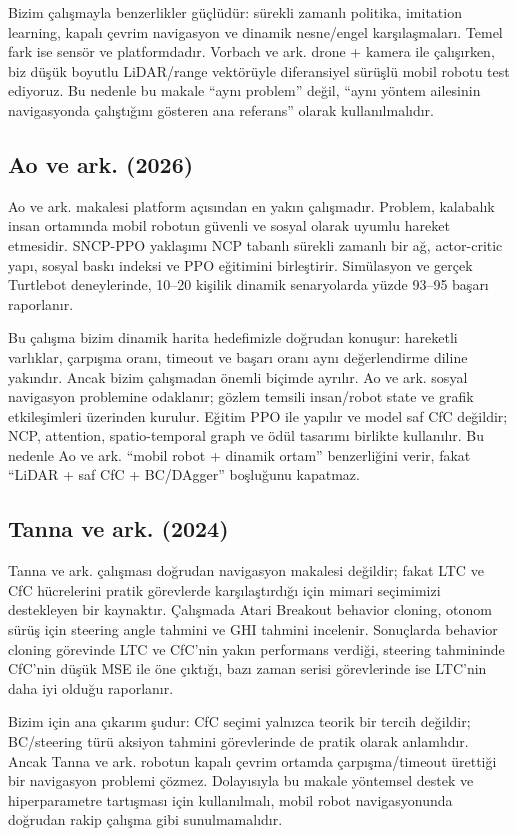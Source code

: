 \documentclass[11pt,a4paper]{article}
\begin{document}
Bizim çalışmayla benzerlikler güçlüdür: sürekli zamanlı politika, imitation
learning, kapalı çevrim navigasyon ve dinamik nesne/engel karşılaşmaları. Temel
fark ise sensör ve platformdadır. Vorbach ve ark. drone + kamera ile çalışırken,
biz düşük boyutlu LiDAR/range vektörüyle diferansiyel sürüşlü mobil robotu test
ediyoruz. Bu nedenle bu makale ``aynı problem'' değil, ``aynı yöntem ailesinin
navigasyonda çalıştığını gösteren ana referans'' olarak kullanılmalıdır.

\subsection{Ao ve ark. (2026)}

Ao ve ark. makalesi platform açısından en yakın çalışmadır. Problem, kalabalık
insan ortamında mobil robotun güvenli ve sosyal olarak uyumlu hareket etmesidir.
SNCP-PPO yaklaşımı NCP tabanlı sürekli zamanlı bir ağ, actor-critic yapı, sosyal
baskı indeksi ve PPO eğitimini birleştirir. Simülasyon ve gerçek Turtlebot
deneylerinde, 10--20 kişilik dinamik senaryolarda yüzde 93--95 başarı raporlanır.

Bu çalışma bizim dinamik harita hedefimizle doğrudan konuşur: hareketli varlıklar,
çarpışma oranı, timeout ve başarı oranı aynı değerlendirme diline yakındır. Ancak
bizim çalışmadan önemli biçimde ayrılır. Ao ve ark. sosyal navigasyon problemine
odaklanır; gözlem temsili insan/robot state ve grafik etkileşimleri üzerinden
kurulur. Eğitim PPO ile yapılır ve model saf CfC değildir; NCP, attention,
spatio-temporal graph ve ödül tasarımı birlikte kullanılır. Bu nedenle Ao ve ark.
``mobil robot + dinamik ortam'' benzerliğini verir, fakat ``LiDAR + saf CfC +
BC/DAgger'' boşluğunu kapatmaz.

\subsection{Tanna ve ark. (2024)}

Tanna ve ark. çalışması doğrudan navigasyon makalesi değildir; fakat LTC ve CfC
hücrelerini pratik görevlerde karşılaştırdığı için mimari seçimimizi destekleyen
bir kaynaktır. Çalışmada Atari Breakout behavior cloning, otonom sürüş için
steering angle tahmini ve GHI tahmini incelenir. Sonuçlarda behavior cloning
görevinde LTC ve CfC'nin yakın performans verdiği, steering tahmininde CfC'nin
düşük MSE ile öne çıktığı, bazı zaman serisi görevlerinde ise LTC'nin daha iyi
olduğu raporlanır.

Bizim için ana çıkarım şudur: CfC seçimi yalnızca teorik bir tercih değildir;
BC/steering türü aksiyon tahmini görevlerinde de pratik olarak anlamlıdır. Ancak
Tanna ve ark. robotun kapalı çevrim ortamda çarpışma/timeout ürettiği bir
navigasyon problemi çözmez. Dolayısıyla bu makale yöntemsel destek ve
hiperparametre tartışması için kullanılmalı, mobil robot navigasyonunda doğrudan
rakip çalışma gibi sunulmamalıdır.
\end{document}
